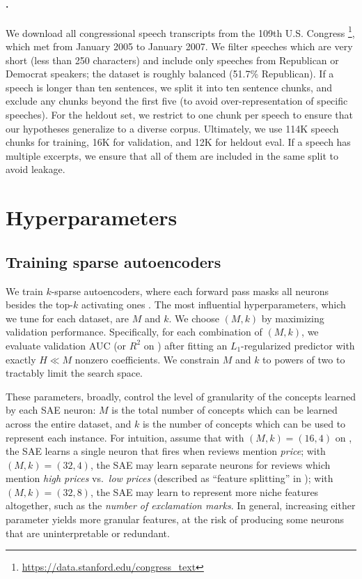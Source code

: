 \paragraph{\congress.} 
We download all congressional speech transcripts from the 109th U.S. Congress \citep{gentzkow_what_2010}\footnote{\href{https://data.stanford.edu/congress_text}{https://data.stanford.edu/congress\_text}}, which met from January 2005 to January 2007. 
We filter speeches which are very short (less than 250 characters) and include only speeches from Republican or Democrat speakers; the dataset is roughly balanced (51.7\% Republican).
If a speech is longer than ten sentences, we split it into ten sentence chunks, and exclude any chunks beyond the first five (to avoid over-representation of specific speeches).
For the heldout set, we restrict to one chunk per speech to ensure that our hypotheses generalize to a diverse corpus. 
Ultimately, we use 114K speech chunks for training, 16K for validation, and 12K for heldout eval. 
If a speech has multiple excerpts, we ensure that all of them are included in the same split to avoid leakage.


\section{Hyperparameters}
\label{sec:hyperparams}

\subsection{Training sparse autoencoders} 
We train $k$-sparse autoencoders, where each forward pass masks all neurons besides the top-$k$ activating ones \citep{makhzani_ksparse_2014, gao_scaling_2024}.
The most influential hyperparameters, which we tune for each dataset, are $M$ and $k$.
We choose $(M, k)$ by maximizing validation performance. 
Specifically, for each combination of $(M, k)$, we evaluate validation AUC (or $R^2$ on \yelp) after fitting an $L_1$-regularized predictor with exactly $H \ll M$ nonzero coefficients. 
We constrain $M$ and $k$ to powers of two to tractably limit the search space.

These parameters, broadly, control the level of granularity of the concepts learned by each SAE neuron: $M$ is the total number of concepts which can be learned across the entire dataset, and $k$ is the number of concepts which can be used to represent each instance.
For intuition, assume that with $(M, k) = (16, 4)$ on \yelp, the SAE learns a single neuron that fires when reviews mention \textit{price}; with $(M, k) = (32, 4)$, the SAE may learn separate neurons for reviews which mention \textit{high prices} vs.~\textit{low prices} (described as ``feature splitting'' in \citet{bricken2023towards}); with $(M, k) = (32, 8)$, the SAE may learn to represent more niche features altogether, such as the \textit{number of exclamation marks}.
In general, increasing either parameter yields more granular features, at the risk of producing some neurons that are uninterpretable or redundant.

